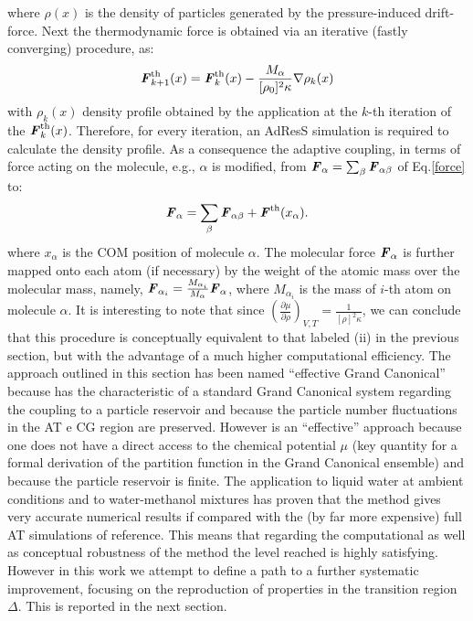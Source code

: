 \documentclass[aps,prb,preprint,citeautoscript]{revtex4}
\newcommand{\recheck}[1]{{\color{black} #1}}
\newcommand{\redc}[1]{{\color{black} #1}}
\renewcommand{\v}[1]{\textbf{\textit{#1}}}
\begin{document}
where $\rho(x)$ is the density of particles generated by the pressure-induced drift-force. Next the thermodynamic force is obtained via an iterative (fastly converging) procedure, as:
\begin{equation}
{\v F}_{k+1}^{\textrm{th}}(x)={\v F}_{k}^{\textrm{th}}(x)-\frac{M_{\alpha}}{[\rho_{0}]^{2}\kappa}\nabla\rho_{k}(x)
\label{iter}
\end{equation}
with $\rho_k(x)$ density profile obtained by the application at the $k$-th iteration of the ${\v F}_k^{\textrm{th}}(x)$.
\redc{Therefore, for every iteration, an AdResS simulation is required to calculate the density profile.}
As a consequence the adaptive coupling, in terms of force acting on the molecule, e.g., $\alpha$ is modified, from ${\v F}_{\alpha}=\sum_{\beta}{\v F}_{\alpha\beta}$ of Eq.\ref{force} to:
\begin{equation}
{\v F}_{\alpha}=\sum_{\beta}{\v F}_{\alpha\beta}+{\v F}^{\textrm{th}}(x_{\alpha}).
\label{mody}
\end{equation}
\recheck{
  where $x_\alpha$ is the COM position of molecule $\alpha$.
  The molecular force ${\v F}_{\alpha}$ 
  is further mapped onto each atom (if necessary) by the weight
of the atomic mass over the molecular mass, namely,
$\v F_{\alpha_i} = \frac{M_{\alpha_i}}{M_\alpha}\v F_{\alpha}$, where
$M_{\alpha_i}$ is the mass of $i$-th atom on molecule $\alpha$.}
 It is interesting to note that since $\left({\frac{\partial\mu}{\partial\rho}}\right)_{V,T}=\frac{1}{[\rho]^{2}\kappa}$, we can conclude that this procedure is conceptually equivalent to that labeled (ii) in the previous section, but with the advantage of a much higher computational efficiency.
The approach outlined in this section has been named ``effective Grand Canonical'' because has the characteristic of a standard Grand Canonical system regarding the coupling to a particle reservoir and because the particle number fluctuations in the AT e CG region are preserved. However is an ``effective'' approach because one does not have a direct access to the chemical potential $\mu$ (key quantity for a formal derivation of the partition function in the Grand Canonical ensemble) and because the particle reservoir is finite. The application to liquid water at ambient conditions \cite{prlgc} and to water-methanol mixtures \cite{debash} has proven that the method gives very accurate numerical results if compared with the (by far more expensive) full AT simulations of reference. This means that regarding the computational as well as conceptual robustness of the method the level reached is highly satisfying. However in this work we attempt to define a path to a further systematic improvement, focusing on the reproduction of properties in the transition region $\Delta$.
This is reported in the next section.
\end{document}

